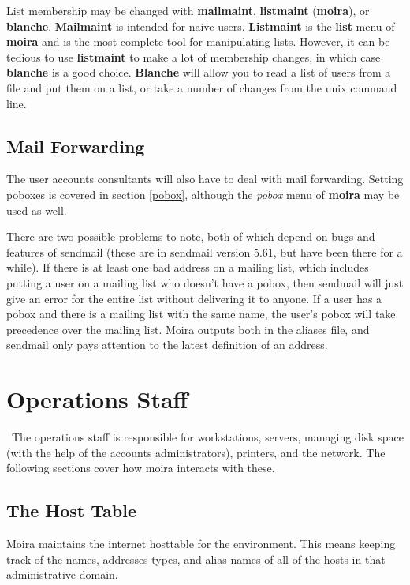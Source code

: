List membership may be changed with {\bf mailmaint}, {\bf listmaint}
({\bf moira}), or {\bf blanche}.  {\bf Mailmaint} is intended for naive
users.  {\bf Listmaint} is the {\bf list} menu of {\bf moira} and is the
most complete tool for manipulating lists.  However, it can be tedious
to use {\bf listmaint} to make a lot of membership changes, in which
case {\bf blanche} is a good choice.  {\bf Blanche} will allow you to read
a list of users from a file and put them on a list, or take a number
of changes from the {\sc unix} command line.

\section{Mail Forwarding}

The user accounts consultants will also have to deal with mail
forwarding.  Setting poboxes is covered in section \ref{pobox},
although the {\em pobox} menu of {\bf moira} may be used as well.

There are two possible problems to note, both of which depend on bugs
and features of sendmail (these are in sendmail version 5.61, but have
been there for a while).  If there is at least one bad address on a
mailing list, which includes putting a user on a mailing list who
doesn't have a pobox, then sendmail will just give an error for the
entire list without delivering it to anyone.   If a user
has a pobox and there is a mailing list with the same name, the user's
pobox will take precedence over the mailing list.  Moira outputs both
in the aliases file, and sendmail only pays attention to the latest
definition of an address.

\chapter{Operations Staff}

\athena\ The operations staff is responsible for workstations,
servers, managing disk space (with the help of the accounts
administrators), printers, and the network.  The following sections
cover how moira interacts with these.

\section{The Host Table}

Moira maintains the internet hosttable for the environment.  This
means keeping track of the names, addresses types, and alias names of
all of the hosts in that administrative domain.

